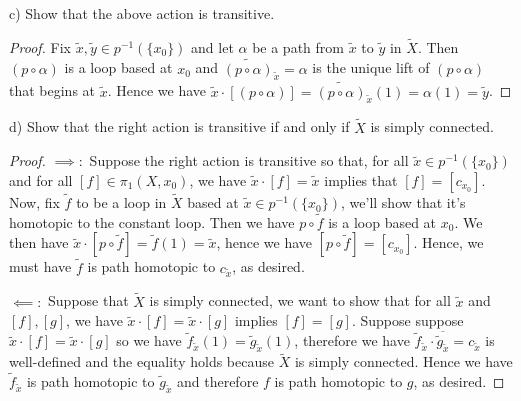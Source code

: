 \documentclass[11pt]{article} %
\newcommand{\wt}{\widetilde}
\begin{document}
c) Show that the above action is transitive.

\begin{proof}
Fix $\wt{x},\wt{y}\in p^{-1}(\{x_0\})$ and let $\alpha$ be a path from $\wt{x}$ to $\wt{y}$ in $\wt{X}$. Then $(p\circ \alpha)$ is a loop based at $x_0$ and $\wt{(p\circ \alpha)}_{\wt{x}} = \alpha$ is the unique lift of $(p\circ \alpha)$ that begins at $\wt{x}$. Hence we have $\wt{x}\cdot [(p\circ \alpha)] = \wt{(p\circ \alpha)}_{\wt{x}}(1) = \alpha(1) = \wt{y}$.
\end{proof}

d) Show that the right action is transitive if and only if $\wt{X}$ is simply connected.

\begin{proof}
$\implies:$ Suppose the right action is transitive so that, for all $\wt{x}\in p^{-1}(\{x_0\})$ and for all $[f]\in \pi_1(X,x_0)$, we have $\wt{x}\cdot [f] = \wt{x}$ implies that $[f] = [c_{x_0}]$. Now, fix $\wt{f}$ to be a loop in $\wt{X}$ based at $\wt{x}\in p^{-1}(\{x_0\})$, we'll show that it's homotopic to the constant loop. Then we have $p \circ \wt{f}$ is a loop based at $x_0$. We then have $\wt{x}\cdot [p\circ \wt{f}] = \wt{f}(1) = \wt{x}$, hence we have $[p\circ \wt{f}] = [c_{x_0}]$. Hence, we must have $\wt{f}$ is path homotopic to $c_{\wt{x}}$, as desired.

$\impliedby:$ Suppose that $\wt{X}$ is simply connected, we want to show that for all $\wt{x}$ and $[f],[g]$, we have $\wt{x}\cdot [f] = \wt{x}\cdot [g]$ implies $[f]=[g]$. Suppose suppose $\wt{x}\cdot [f] = \wt{x}\cdot [g]$ so we have $\wt{f}_{\wt{x}}(1) = \wt{g}_{\wt{x}}(1)$, therefore we have $\wt{f}_{\wt{x}}\cdot \overline{\wt{g}_{\wt{x}}} = c_{\wt{x}}$ is well-defined and the equality holds because $\wt{X}$ is simply connected. Hence we have $\wt{f}_{\wt{x}}$ is path homotopic to $\wt{g}_{\wt{x}}$ and therefore $f$ is path homotopic to $g$, as desired.
\end{proof}
\end{document}
